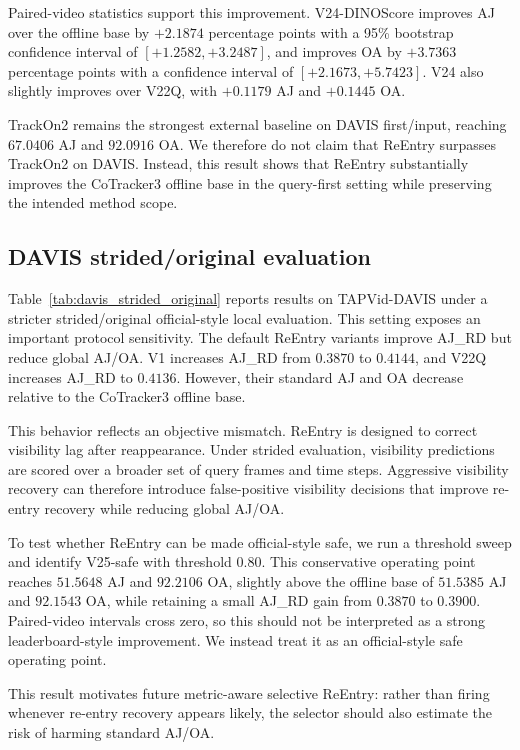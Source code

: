 Paired-video statistics support this improvement. V24-DINOScore improves AJ over the offline base by $+2.1874$ percentage points with a 95\% bootstrap confidence interval of $[+1.2582,+3.2487]$, and improves OA by $+3.7363$ percentage points with a confidence interval of $[+2.1673,+5.7423]$. V24 also slightly improves over V22Q, with $+0.1179$ AJ and $+0.1445$ OA.

TrackOn2 remains the strongest external baseline on DAVIS first/input, reaching $67.0406$ AJ and $92.0916$ OA. We therefore do not claim that ReEntry surpasses TrackOn2 on DAVIS. Instead, this result shows that ReEntry substantially improves the CoTracker3 offline base in the query-first setting while preserving the intended method scope.

\subsection{DAVIS strided/original evaluation}
\label{sec:davis_strided_original}

Table~\ref{tab:davis_strided_original} reports results on TAPVid-DAVIS under a stricter strided/original official-style local evaluation. This setting exposes an important protocol sensitivity. The default ReEntry variants improve AJ\_RD but reduce global AJ/OA. V1 increases AJ\_RD from $0.3870$ to $0.4144$, and V22Q increases AJ\_RD to $0.4136$. However, their standard AJ and OA decrease relative to the CoTracker3 offline base.

This behavior reflects an objective mismatch. ReEntry is designed to correct visibility lag after reappearance. Under strided evaluation, visibility predictions are scored over a broader set of query frames and time steps. Aggressive visibility recovery can therefore introduce false-positive visibility decisions that improve re-entry recovery while reducing global AJ/OA.

To test whether ReEntry can be made official-style safe, we run a threshold sweep and identify V25-safe with threshold $0.80$. This conservative operating point reaches $51.5648$ AJ and $92.2106$ OA, slightly above the offline base of $51.5385$ AJ and $92.1543$ OA, while retaining a small AJ\_RD gain from $0.3870$ to $0.3900$. Paired-video intervals cross zero, so this should not be interpreted as a strong leaderboard-style improvement. We instead treat it as an official-style safe operating point.

This result motivates future metric-aware selective ReEntry: rather than firing whenever re-entry recovery appears likely, the selector should also estimate the risk of harming standard AJ/OA.

